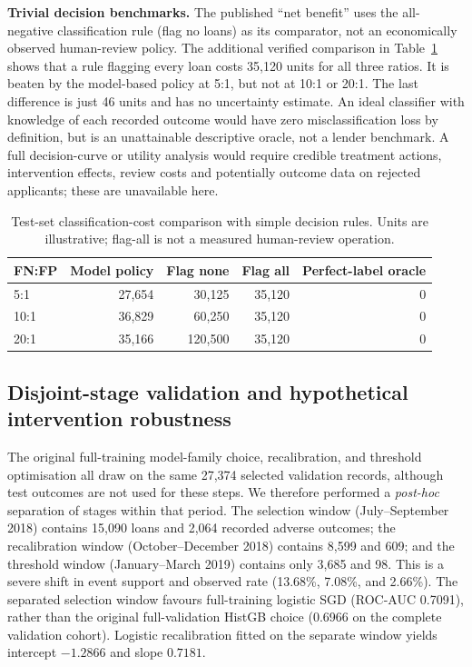 \documentclass[10pt]{article}
\begin{document}
\noindent\textbf{Trivial decision benchmarks.} The published ``net benefit'' uses the all-negative classification rule (flag no loans) as its comparator, not an economically observed human-review policy. The additional verified comparison in Table~\ref{tab:r2_policy_benchmarks} shows that a rule flagging every loan costs 35,120 units for all three ratios. It is beaten by the model-based policy at 5:1, but not at 10:1 or 20:1. The last difference is just 46 units and has no uncertainty estimate. An ideal classifier with knowledge of each recorded outcome would have zero misclassification loss by definition, but is an unattainable descriptive oracle, not a lender benchmark. A full decision-curve or utility analysis would require credible treatment actions, intervention effects, review costs and potentially outcome data on rejected applicants; these are unavailable here.

\begin{table}[!ht]
\centering
\caption{Test-set classification-cost comparison with simple decision rules. Units are illustrative; flag-all is not a measured human-review operation.}
\label{tab:r2_policy_benchmarks}
\begin{tabular}{lrrrr}
\toprule
FN:FP & Model policy & Flag none & Flag all & Perfect-label oracle \\
\midrule
5:1 & 27,654 & 30,125 & 35,120 & 0 \\
10:1 & 36,829 & 60,250 & 35,120 & 0 \\
20:1 & 35,166 & 120,500 & 35,120 & 0 \\
\bottomrule
\end{tabular}
\end{table}

\subsection{Disjoint-stage validation and hypothetical intervention robustness}
\label{sec:disjoint_validation}
The original full-training model-family choice, recalibration, and threshold optimisation all draw on the same 27,374 selected validation records, although test outcomes are not used for these steps. We therefore performed a \emph{post-hoc} separation of stages within that period. The selection window (July--September 2018) contains 15,090 loans and 2,064 recorded adverse outcomes; the recalibration window (October--December 2018) contains 8,599 and 609; and the threshold window (January--March 2019) contains only 3,685 and 98. This is a severe shift in event support and observed rate (13.68\%, 7.08\%, and 2.66\%). The separated selection window favours full-training logistic SGD (ROC-AUC 0.7091), rather than the original full-validation HistGB choice (0.6966 on the complete validation cohort). Logistic recalibration fitted on the separate window yields intercept $-1.2866$ and slope $0.7181$.
\end{document}
